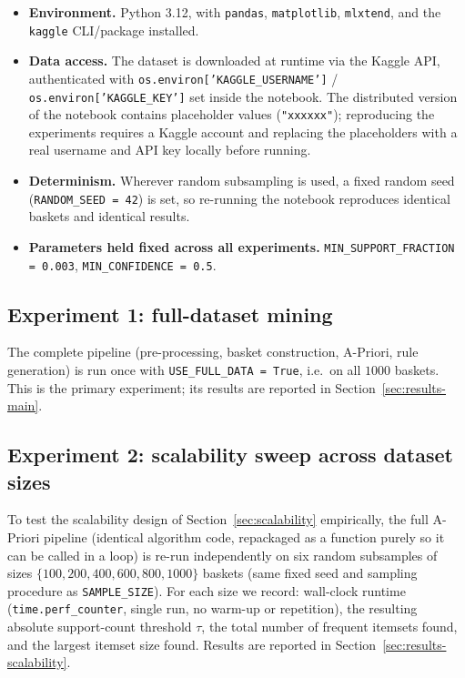 \documentclass[11pt,a4paper]{article}
\begin{document}
\begin{itemize}
    \item \textbf{Environment.} Python 3.12, with \texttt{pandas},
    \texttt{matplotlib}, \texttt{mlxtend}, and the \texttt{kaggle} CLI/package
    installed.
    \item \textbf{Data access.} The dataset is downloaded at runtime via the
    Kaggle API, authenticated with \texttt{os.environ['KAGGLE\_USERNAME']} /
    \texttt{os.environ['KAGGLE\_KEY']} set inside the notebook. The
    distributed version of the notebook contains placeholder values
    (\texttt{"xxxxxx"}); reproducing the experiments requires a Kaggle
    account and replacing the placeholders with a real username and API key
    locally before running.
    \item \textbf{Determinism.} Wherever random subsampling is used, a fixed
    random seed (\texttt{RANDOM\_SEED = 42}) is set, so re-running the
    notebook reproduces identical baskets and identical results.
    \item \textbf{Parameters held fixed across all experiments.}
    \texttt{MIN\_SUPPORT\_FRACTION = 0.003}, \texttt{MIN\_CONFIDENCE = 0.5}.
\end{itemize}

\subsection{Experiment 1: full-dataset mining}

The complete pipeline (pre-processing, basket construction, A-Priori, rule
generation) is run once with \texttt{USE\_FULL\_DATA = True}, i.e.\ on all
$1000$ baskets. This is the primary experiment; its results are reported in
Section~\ref{sec:results-main}.

\subsection{Experiment 2: scalability sweep across dataset sizes}

To test the scalability design of Section~\ref{sec:scalability} empirically,
the full A-Priori pipeline (identical algorithm code, repackaged as a
function purely so it can be called in a loop) is re-run independently on six
random subsamples of sizes $\{100, 200, 400, 600, 800, 1000\}$ baskets (same
fixed seed and sampling procedure as \texttt{SAMPLE\_SIZE}). For each size we
record: wall-clock runtime (\texttt{time.perf\_counter}, single run, no
warm-up or repetition), the resulting absolute support-count threshold $\tau$,
the total number of frequent itemsets found, and the largest itemset size
found. Results are reported in Section~\ref{sec:results-scalability}.
\end{document}
